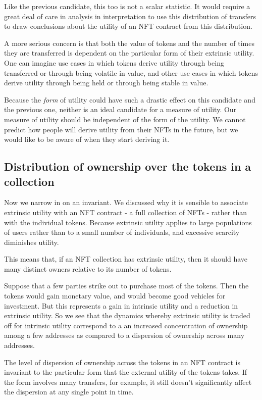 \documentclass{article}
\begin{document}
Like the previous candidate, this too is not a scalar statistic. It would require a great deal of care in analysis in interpretation to use this distribution of transfers to draw conclusions about the utility of an NFT contract from this distribution.

A more serious concern is that both the value of tokens and the number of times they are transferred is dependent on the particular form of their extrinsic utility. One can imagine use cases in which tokens derive utility through being transferred or through being volatile in value, and other use cases in which tokens derive utility through being held or through being stable in value.

Because the \emph{form} of utility could have such a drastic effect on this candidate and the previous one, neither is an ideal candidate for a measure of utility. Our measure of utility should be independent of the form of the utility. We cannot predict how people will derive utility from their NFTs in the future, but we would like to be aware of when they start deriving it.

\subsection{Distribution of ownership over the tokens in a collection}

Now we narrow in on an invariant. We discussed why it is sensible to associate extrinsic utility with an NFT contract - a full collection of NFTs - rather than with the individual tokens. Because extrinsic utility applies to large populations of users rather than to a small number of individuals, and excessive scarcity diminishes utility.

This means that, if an NFT collection has extrinsic utility, then it should have many distinct owners relative to its number of tokens.

Suppose that a few parties strike out to purchase most of the tokens. Then the tokens would gain monetary value, and would become good vehicles for investment. But this represents a gain in intrinsic utility and a reduction in extrinsic utility. So we see that the dynamics whereby extrinsic utility is traded off for intrinsic utility correspond to a an increased concentration of ownership among a few addresses as compared to a dispersion of ownership across many addresses.

The level of dispersion of ownership across the tokens in an NFT contract is invariant to the particular form that the external utility of the tokens takes. If the form involves many transfers, for example, it still doesn't significantly affect the dispersion at any single point in time.
\end{document}
